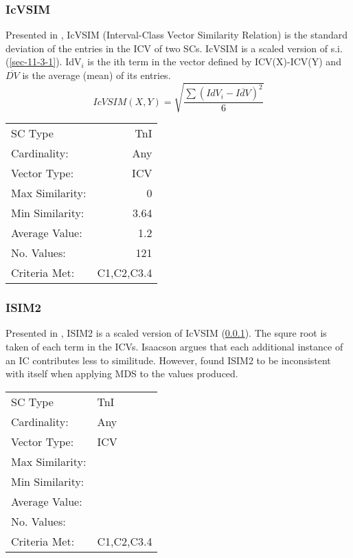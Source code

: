 \documentclass{article}
\begin{document}
\subsubsection{IcVSIM}
\label{sec-11-6-2}

Presented in \citet[pp. 18]{Isaacson1990}, IcVSIM (Interval-Class
Vector Similarity Relation) is the standard deviation of the entries
in the ICV of two SCs. IcVSIM is a scaled version of
s.i. (\ref{sec-11-3-1}). IdV$_{i}$ is the ith term in the vector defined by
ICV(X)-ICV(Y) and $\overline{DV}$ is the average (mean) of its
entries.
$$IcVSIM(X,Y)=\sqrt{\frac{\sum(IdV_{i}-\overline{IdV})^{2}}{6}}$$

\begin{center}
\begin{tabular}{lr}
 SC Type          &         TnI  \\
 Cardinality:     &         Any  \\
 Vector Type:     &         ICV  \\
 Max Similarity:  &           0  \\
 Min Similarity:  &        3.64  \\
 Average Value:   &         1.2  \\
 No. Values:      &         121  \\
 Criteria Met:    &  C1,C2,C3.4  \\
\end{tabular}
\end{center}
\subsubsection{ISIM2}
\label{sec-11-6-3}

Presented in \citet{Isaacson1996}, ISIM2 is a scaled version of IcVSIM
(\ref{sec-11-6-2}). The squre root is taken of each term in the ICVs. Isaacson
argues that each additional instance of an IC contributes less to
similitude. However, \citet{Samplaski2005a} found ISIM2 to be
inconsistent with itself when applying MDS to the values produced.

\begin{center}
\begin{tabular}{ll}
 SC Type          &  TnI         \\
 Cardinality:     &  Any         \\
 Vector Type:     &  ICV         \\
 Max Similarity:  &              \\
 Min Similarity:  &              \\
 Average Value:   &              \\
 No. Values:      &              \\
 Criteria Met:    &  C1,C2,C3.4  \\
\end{tabular}
\end{center}
\end{document}
